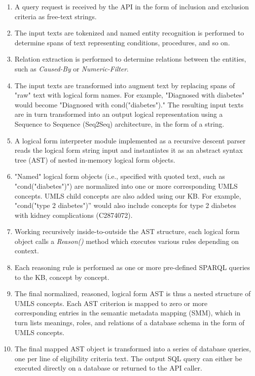 \documentclass[../main.tex]{subfiles}
\begin{document}
\begin{enumerate}
    \item{A query request is received by the API in the form of inclusion and exclusion criteria as free-text strings.}
    \item{The input texts are tokenized and named entity recognition is performed to determine spans of text representing conditions, procedures, and so on.}
    \item{Relation extraction is performed to determine relations between the entities, such as \textit{Caused-By} or \textit{Numeric-Filter}.}
    \item{The input texts are transformed into augment text by replacing spans of "raw" text with logical form names. For example, "Diagnosed with diabetes" would become "Diagnosed with cond("diabetes")." The resulting input texts are in turn transformed into an output logical representation using a Sequence to Sequence (Seq2Seq) architecture, in the form of a string.}
    \item{A logical form interpreter module implemented as a recursive descent parser \cite{johnstone1998generalised} reads the logical form string input and instantiates it as an abstract syntax tree (AST) of nested in-memory logical form objects.}
    \item{"Named" logical form objects (i.e., specified with quoted text, such as "cond("diabetes")") are normalized into one or more corresponding UMLS concepts. UMLS child concepts are also added using our KB. For example, "cond("type 2 diabetes")” would also include concepts for type 2 diabetes with kidney complications (C2874072).}
    \item{Working recursively inside-to-outside the AST structure, each logical form object calls a \textit{Reason()} method which executes various rules depending on context.}
    \item{Each reasoning rule is performed as one or more pre-defined SPARQL queries to the KB, concept by concept.}
    \item{The final normalized, reasoned, logical form AST is thus a nested structure of UMLS concepts. Each AST criterion is mapped to zero or more corresponding entries in the semantic metadata mapping (SMM), which in turn lists meanings, roles, and relations of a database schema in the form of UMLS concepts.}
    \item{The final mapped AST object is transformed into a series of database queries, one per line of eligibility criteria text. The output SQL query can either be executed directly on a database or returned to the API caller.}
\end{enumerate}
\end{document}
